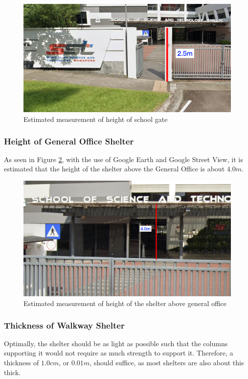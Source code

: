 \documentclass[a4paper,titlepage]{article}
\begin{document}
\begin{figure}[htbp]
    \centering
    \includegraphics[width=\textwidth]{schoolGateHeight.png}
    \caption{Estimated measurement of height of school gate}
    \label{fig:schoolGateHeight}
\end{figure}

\subsubsection{Height of General Office Shelter}

As seen in Figure \ref{fig:goShelterHeight}, with the use of Google Earth and Google Street View, it is estimated that the height of the shelter above the General Office is about $4.0\si{m}$.

\begin{figure}[htbp]
    \centering
    \includegraphics[width=\textwidth]{goShelterHeight.png}
    \caption{Estimated measurement of height of the shelter above general office}
    \label{fig:goShelterHeight}
\end{figure}

\subsubsection{Thickness of Walkway Shelter}
Optimally, the shelter should be as light as possible such that the columns supporting it would not require as much strength to support it. Therefore, a thickness of $1.0\si{cm}$, or $0.01\si{m}$, should suffice, as most shelters are also about this thick.
\end{document}
